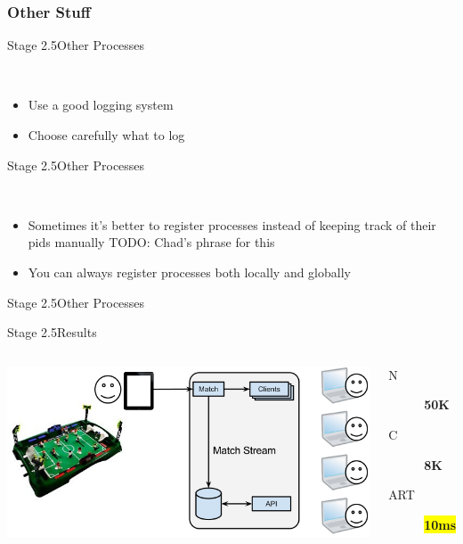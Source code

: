 \documentclass[utf8]{beamer}
\begin{document}
\subsubsection{Other Stuff}
\begin{frame}{Stage 2.5}{Other Processes}
	\begin{description}
		\item<+->[Logging]\ \\
			\begin{itemize}
				\item Use a good logging system
				\item Choose carefully what to log
			\end{itemize}
	\end{description}
\end{frame}
\begin{frame}{Stage 2.5}{Other Processes}
	\begin{description}
		\item<+->[Registration]\ \\
			\begin{itemize}
				\item Sometimes it's better to register processes instead of keeping track of their pids manually
				{\Huge TODO: Chad's phrase for this}
				\item You can always register processes \alert{both} locally and globally
			\end{itemize}
	\end{description}
\end{frame}
\begin{frame}{Stage 2.5}{Other Processes}
\dispatcher
\end{frame}
\begin{frame}{Stage 2.5}{Results}
	\begin{columns}
		\column{.64\textwidth}
			\includegraphics[top=-1,width=\textwidth]{img/results-4.png}
		\column{.35\textwidth}
			\begin{description}
				\item[N] \textbf{\Large 50K}
				\item[C] \textbf{\Large 8K}
				\item[ART] \textbf{\colorbox{yellow}{\Large 10ms}}
			\end{description}
	\end{columns}
\end{frame}
\end{document}
